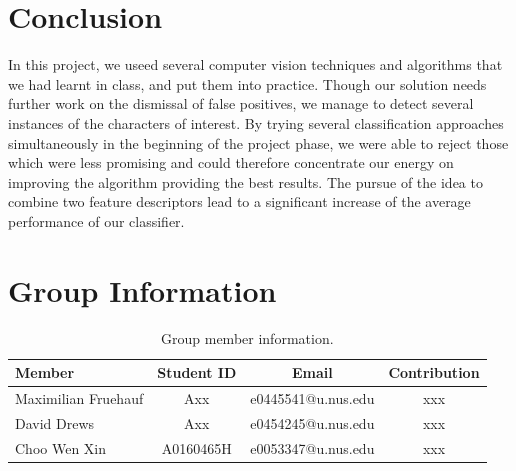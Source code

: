 \documentclass[11pt]{article}
\begin{document}
\section{Conclusion}
In this project, we useed several computer vision techniques and algorithms that we had
learnt in class, and put them into practice. Though our solution needs further work on the dismissal of
false positives, we manage to detect several instances of the characters of interest. By trying several
classification approaches simultaneously in the beginning of the project phase, we were able to reject those
which were less promising and could therefore concentrate our energy on improving the algorithm providing
the best results. The pursue of the idea to combine two feature descriptors lead to a significant increase
of the average performance of our classifier.

\section{Group Information}

\begin{table}[ht]
    \centering
    \begin{tabular}{lccc}
    \toprule
     Member & Student ID & Email & Contribution\\
    \midrule
    Maximilian Fruehauf& Axx & e0445541@u.nus.edu & xxx \\
    David Drews& Axx &e0454245@u.nus.edu & xxx  \\
    Choo Wen Xin& A0160465H & e0053347@u.nus.edu & xxx  \\
    \bottomrule
    \end{tabular}
    \caption{Group member information.}
    \label{tab:dataset}
\end{table}




 
\end{document}
